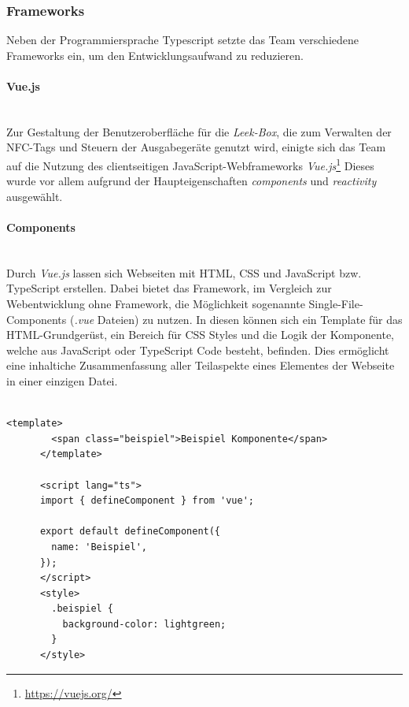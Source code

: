\documentclass[10pt, a4paper]{article}
\begin{document}
\begin{onehalfspace}
  \subsubsection{Frameworks}
  Neben der Programmiersprache Typescript setzte das Team verschiedene Frameworks ein, um den Entwicklungsaufwand zu reduzieren.

  \paragraph*{Vue.js} $~$ \\
  Zur Gestaltung der Benutzeroberfläche für die \textit{Leek-Box}, die zum Verwalten der NFC-Tags und Steuern der Ausgabegeräte genutzt wird, einigte sich das Team auf die Nutzung des
  clientseitigen JavaScript-Webframeworks \textit{Vue.js}\footnote{\raggedright\url{https://vuejs.org/}}
  Dieses wurde vor allem aufgrund der Haupteigenschaften \textit{components} und \textit{reactivity} ausgewählt.

  \paragraph*{Components} $~$ \\
  Durch \textit{Vue.js} lassen sich Webseiten mit HTML, CSS und JavaScript bzw. TypeScript erstellen. Dabei bietet das Framework, im Vergleich zur Webentwicklung ohne Framework, die Möglichkeit sogenannte Single-File-Components (\textit{.vue} Dateien) zu nutzen. In diesen können sich ein Template für das HTML-Grundgerüst, ein Bereich für CSS Styles und die Logik der Komponente, welche aus JavaScript oder TypeScript Code besteht, befinden. Dies ermöglicht eine inhaltiche Zusammenfassung aller Teilaspekte eines Elementes der Webseite in einer einzigen Datei.
  \\~\\
  \begin{minipage}{\textwidth}
    \begin{lstlisting}[caption={Beispiel einer simplen \textit{vue component}-Datei}, captionpos=b, label=lst:EinfacheComponent]
      <template>
        <span class="beispiel">Beispiel Komponente</span>
      </template>

      <script lang="ts">
      import { defineComponent } from 'vue';

      export default defineComponent({
        name: 'Beispiel',
      });
      </script>
      <style>
        .beispiel {
          background-color: lightgreen;
        }
      </style>
    \end{lstlisting}
  \end{minipage}


\end{onehalfspace}
\end{document}
